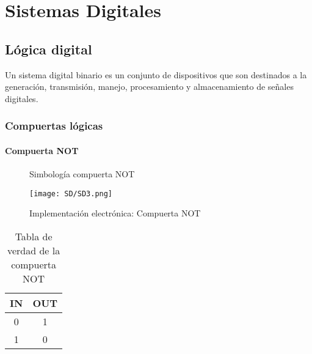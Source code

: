 \documentclass[
	11pt, %
	fleqn, %
	a4paper, %
]{LegrandOrangeBook}
\begin{document}
\part{Sistemas Digitales}
\chapter{Lógica digital}
Un sistema digital binario es un conjunto de dispositivos que son destinados a la generación, transmisión, manejo, procesamiento y almacenamiento de señales digitales.
\section{Compuertas lógicas}
\subsection{Compuerta NOT}
\begin{figure}[H]
\centering
{}
\caption{Simbología compuerta NOT}
\end{figure}
\begin{figure}[h!]
\centering
\texttt{[image: SD/SD3.png]}
\caption{Implementación electrónica: Compuerta NOT}
\end{figure}
\begin{table}[H]
\begin{center}
\begin{tabular}{|c|c|}
\hline
\rowcolor{color1}
IN & OUT \\ \hline
0  & 1   \\ \hline
1  & 0   \\ \hline
\end{tabular}
\end{center}
\caption{Tabla de verdad de la compuerta NOT}
\label{table:nottable}
\end{table}
\end{document}
